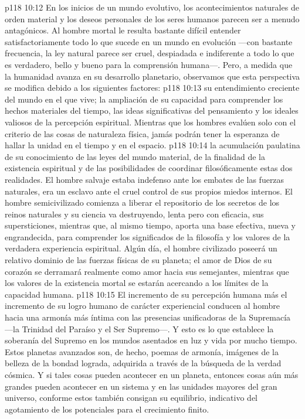 \vs p118 10:12 \pc En los inicios de un mundo evolutivo, los acontecimientos naturales de orden material y los deseos personales de los seres humanos parecen ser a menudo antagónicos. Al hombre mortal le resulta bastante difícil entender satisfactoriamente todo lo que sucede en un mundo en evolución ---con bastante frecuencia, la ley natural parece ser cruel, despiadada e indiferente a todo lo que es verdadero, bello y bueno para la comprensión humana---. Pero, a medida que la humanidad avanza en su desarrollo planetario, observamos que esta perspectiva se modifica debido a los siguientes factores:
\vs p118 10:13  su entendimiento creciente del mundo en el que vive; la ampliación de su capacidad para comprender los hechos materiales del tiempo, las ideas significativas del pensamiento y los ideales valiosos de la percepción espiritual. Mientras que los hombres evalúen solo con el criterio de las cosas de naturaleza física, jamás podrán tener la esperanza de hallar la unidad en el tiempo y en el espacio.
\vs p118 10:14  la acumulación paulatina de su conocimiento de las leyes del mundo material, de la finalidad de la existencia espiritual y de las posibilidades de coordinar filosóficamente estas dos realidades. El hombre salvaje estaba indefenso ante los embates de las fuerzas naturales, era un esclavo ante el cruel control de sus propios miedos internos. El hombre semicivilizado comienza a liberar el repositorio de los secretos de los reinos naturales y su ciencia va destruyendo, lenta pero con eficacia, sus supersticiones, mientras que, al mismo tiempo, aporta una base efectiva, nueva y engrandecida, para comprender los significados de la filosofía y los valores de la verdadera experiencia espiritual. Algún día, el hombre civilizado poseerá un relativo dominio de las fuerzas físicas de su planeta; el amor de Dios de su corazón se derramará realmente como amor hacia sus semejantes, mientras que los valores de la existencia mortal se estarán acercando a los límites de la capacidad humana.
\vs p118 10:15  El incremento de su percepción humana más el incremento de su logro humano de carácter experiencial conducen al hombre hacia una armonía más íntima con las presencias unificadoras de la Supremacía ---la Trinidad del Paraíso y el Ser Supremo---. Y esto es lo que establece la soberanía del Supremo en los mundos asentados en luz y vida por mucho tiempo. Estos planetas avanzados son, de hecho, poemas de armonía, imágenes de la belleza de la bondad lograda, adquirida a través de la búsqueda de la verdad cósmica. Y si tales cosas pueden acontecer en un planeta, entonces cosas aún más grandes pueden acontecer en un sistema y en las unidades mayores del gran universo, conforme estos también consigan su equilibrio, indicativo del agotamiento de los potenciales para el crecimiento finito.
